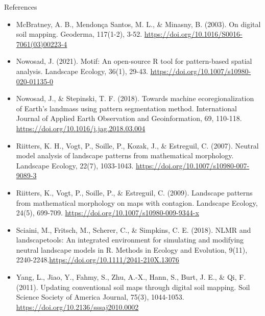 \documentclass[aspectratio=169, 10pt]{beamer}
\begin{document}
\begin{frame}[allowframebreaks]{References}
\begin{scriptsize}
\begin{itemize}
    \item McBratney, A. B., Mendon\c{c}a Santos, M. L., \& Minasny, B. (2003). On digital soil mapping. Geoderma, 117(1-2), 3-52. \url{https://doi.org/10.1016/S0016-7061(03)00223-4}

    \item Nowosad, J. (2021). Motif: An open-source R tool for pattern-based spatial analysis. Landscape Ecology, 36(1), 29-43. \url{https://doi.org/10.1007/s10980-020-01135-0}

    
    \item Nowosad, J., \& Stepinski, T. F. (2018). Towards machine ecoregionalization of Earth’s landmass using pattern segmentation method. International Journal of Applied Earth Observation and Geoinformation, 69, 110-118. \url{https://doi.org/10.1016/j.jag.2018.03.004}

    \item Riitters, K. H., Vogt, P., Soille, P., Kozak, J., \& Estreguil, C. (2007). Neutral model analysis of landscape patterns from mathematical morphology. Landscape Ecology, 22(7), 1033-1043. \url{https://doi.org/10.1007/s10980-007-9089-3}

    \item Riitters, K., Vogt, P., Soille, P., \& Estreguil, C. (2009). Landscape patterns from mathematical morphology on maps with contagion. Landscape Ecology, 24(5), 699-709. \url{https://doi.org/10.1007/s10980-009-9344-x}

    \item Sciaini, M., Fritsch, M., Scherer, C., \& Simpkins, C. E. (2018). NLMR and landscapetools: An integrated environment for simulating and modifying neutral landscape models in R. Methods in Ecology and Evolution, 9(11), 2240-2248.\url{https://doi.org/10.1111/2041-210X.13076}

      \item Yang, L., Jiao, Y., Fahmy, S., Zhu, A.-X., Hann, S., Burt, J. E., \& Qi, F. (2011). Updating conventional soil maps through digital soil mapping. Soil Science Society of America Journal, 75(3), 1044-1053. \url{https://doi.org/10.2136/sssaj2010.0002}

    \end{itemize}
        
  \end{scriptsize}

\end{frame}

\end{document}
